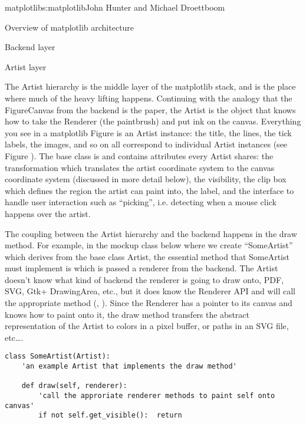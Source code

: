 \begin{aosachapter}{matplotlib}{s:matplotlib}{John Hunter and Michael Droettboom}
\begin{aosasect1}{Overview of matplotlib architecture}
\begin{aosasect2}{Backend layer}
\end{aosasect2}

\begin{aosasect2}{Artist layer}

The Artist hierarchy is the middle layer of the matplotlib stack, and
is the place where much of the heavy lifting happens.  Continuing with
the analogy that the FigureCanvas from the backend is the paper, the
Artist is the object that knows how to take the Renderer (the
paintbrush) and put ink on the canvas.  Everything you see in a
matplotlib Figure is an Artist instance: the title, the lines, the
tick labels, the images, and so on all correspond to individual Artist
instances (see Figure \cite{fig.matplotlib.artists_tree}).  The base
class is  and contains attributes every
Artist shares: the transformation which translates the artist
coordinate system to the canvas coordinate system (discussed in more
detail below), the visibility, the clip box which defines the region
the artist can paint into, the label, and the interface to handle user
interaction such as ``picking'', i.e. detecting when a mouse click
happens over the artist.



The coupling between the Artist hierarchy and the backend happens in
the draw method.  For example, in the mockup class below where we
create ``SomeArtist'' which derives from the base class Artist, the
essential method that SomeArtist must implement is  which
is passed a renderer from the backend.  The Artist doesn't know what
kind of backend the renderer is going to draw onto, PDF, SVG, Gtk+
DrawingArea, etc., but it does know the Renderer API and will call the
appropriate method (, ).  Since the
Renderer has a pointer to its canvas and knows how to paint onto it,
the draw method transfers the abstract representation of the Artist to
colors in a pixel buffer, or paths in an SVG file, etc\dots{}.

\begin{verbatim}
class SomeArtist(Artist):
    'an example Artist that implements the draw method'

    def draw(self, renderer):
        'call the approriate renderer methods to paint self onto canvas'
        if not self.get_visible():  return


\end{verbatim}
\end{aosasect2}
\end{aosasect1}
\end{aosachapter}
